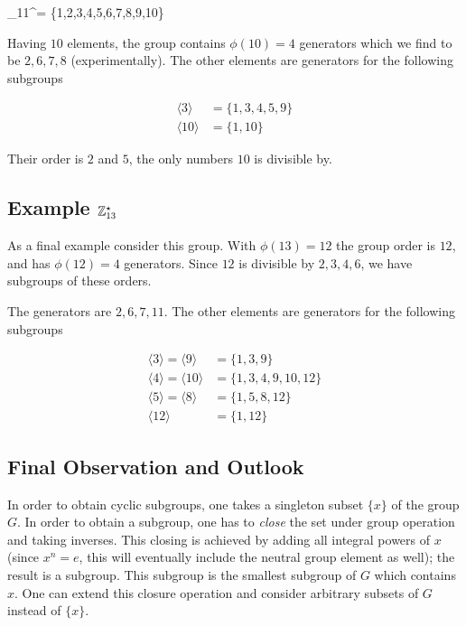 \bee
\mZ_{11}^\star= \{1,2,3,4,5,6,7,8,9,10\}
\eee

Having $10$ elements, the group contains $\phi(10) = 4$ generators which we find to be $2,6,7,8$ (experimentally). The other elements are generators for the following subgroups

\begin{align*}
\langle 3 \rangle & = \{1,3,4,5,9\}  \\
\langle 10 \rangle & = \{1,10\}
\end{align*}

Their order is $2$ and $5$, the only numbers $10$ is divisible by.

\subsection{Example $\mathbb{Z}_{13}^\star$}

As a final example consider this group. With $\phi(13) = 12$ the group order is $12$, and has $\phi(12) = 4$ generators. Since $12$ is divisible by $2,3,4,6$, we have subgroups of these orders.

The generators are $2, 6, 7, 11$. The other elements are generators for the following subgroups

\begin{align*}
\langle 3 \rangle = \langle 9 \rangle & = \{1,3,9\}  \\
\langle 4 \rangle = \langle 10 \rangle & = \{1,3,4,9,10,12\} \\
\langle 5 \rangle = \langle 8 \rangle & = \{1,5,8,12\} \\
\langle 12 \rangle & = \{1,12\}
\end{align*}

\subsection{Final Observation and Outlook}

In order to obtain cyclic subgroups, one takes a singleton subset $\{x\}$ of the group $G$. In order to obtain a subgroup, one has to \emph{close} the set under group operation and taking inverses. This closing is achieved by adding all integral powers of $x$ (since $x^n = e$, this will eventually include the neutral group element as well); the result is a subgroup. This subgroup is the smallest subgroup of $G$ which contains $x$. One can extend this closure operation and consider arbitrary subsets of $G$ instead of $\{x\}$.